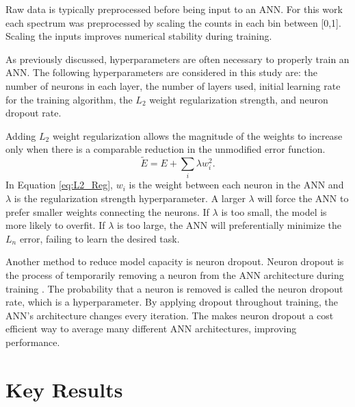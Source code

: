 \documentclass[tocnosub,noragright,centerchapter,12pt,fullpage]{uiucecethesis09}
\begin{document}
Raw data is typically preprocessed before being input to an ANN. For this work each spectrum was preprocessed by scaling the counts in each bin between [0,1]. Scaling the inputs improves numerical stability during training. 

As previously discussed, hyperparameters are often necessary to properly train an ANN. The following hyperparameters are considered in this study are: the number of neurons in each layer, the number of layers used, initial learning rate for the training algorithm, the $L_2$ weight regularization strength, and neuron dropout rate. 

Adding $L_2$ weight regularization allows the magnitude of the weights to increase only when there is a comparable reduction in the unmodified error function.
%
\begin{equation} \label{eq:L2_Reg}
\tilde{E} = E + \sum_i \lambda w_i^2.
\end{equation}
%
In Equation \ref{eq:L2_Reg}, $w_i$ is the weight between each neuron in the ANN and $\lambda$ is the regularization strength hyperparameter. A larger $\lambda$ will force the ANN to prefer smaller weights connecting the neurons. If $\lambda$ is too small, the model is more likely to overfit. If $\lambda$ is too large, the ANN will preferentially minimize the $L_n$ error, failing to learn the desired task.

Another method to reduce model capacity is neuron dropout. Neuron dropout is the process of temporarily removing a neuron from the ANN architecture during training \cite{Srivastava2014}. The probability that a neuron is removed is called the neuron dropout rate, which is a hyperparameter. By applying dropout throughout training, the ANN's architecture changes every iteration. The makes neuron dropout a cost efficient way to average many different ANN architectures, improving performance.



\section{Key Results}




\end{document}
